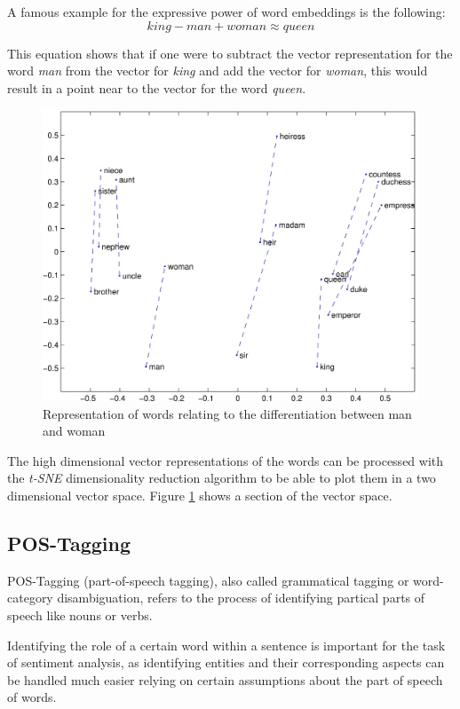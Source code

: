 \documentclass[10pt,a4paper]{article}
\begin{document}
		A famous example for the expressive power of word embeddings is the following:
		\begin{displaymath}
			king-man+woman \approx queen
		\end{displaymath}
		
		This equation shows that if one were to subtract the vector representation for the word \textit{man} from the vector for \textit{king} and add the vector for \textit{woman}, this would result in a point near to the vector for the word \textit{queen}.
		
		\begin{figure}[h]
			\centering
			\includegraphics[width=0.8\linewidth]{data/man_woman}
			\caption{Representation of words relating to the differentiation between man and woman}
			\label{fig:wordembeddings}
		\end{figure}
		
		The high dimensional vector representations of the words can be processed with the \textit{t-SNE} dimensionality reduction algorithm to be able to plot them in a two dimensional vector space. Figure \ref{fig:wordembeddings} shows a section of the vector space.
		
		\subsection{POS-Tagging}

		POS-Tagging (part-of-speech tagging), also called grammatical tagging or word-category disambiguation, refers to the process of identifying partical parts of speech like nouns or verbs. 

		Identifying the role of a certain word within a sentence is important for the task of sentiment analysis, as identifying entities and their corresponding aspects can be handled much easier relying on certain assumptions about the part of speech of words.
\end{document}
